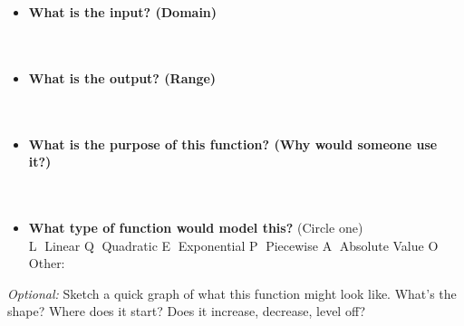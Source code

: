 \documentclass[12pt]{article}
\begin{document}
\begin{itemize}
  \item \textbf{What is the input? (Domain)} \\[0.5em]
    \underline{\hspace{0.9\textwidth}}\\[1em]
      \underline{\hspace{0.9\textwidth}}\\

  \item \textbf{What is the output? (Range)} \\[0.5em]
    \underline{\hspace{0.9\textwidth}}\\[1em]
      \underline{\hspace{0.9\textwidth}}\\

  \item \textbf{What is the purpose of this function? (Why would someone use it?)} \\[0.5em]
    \underline{\hspace{0.9\textwidth}}\\[1em]
      \underline{\hspace{0.9\textwidth}}\\

  \item \textbf{What type of function would model this?} (Circle one) \\[0.5em]
  \textcircled{\scriptsize L} Linear \quad
  \textcircled{\scriptsize Q} Quadratic \quad
  \textcircled{\scriptsize E} Exponential \quad
  \textcircled{\scriptsize P} Piecewise \quad
  \textcircled{\scriptsize A} Absolute Value \quad
  \textcircled{\scriptsize O} Other: \underline{\hspace{1in}}

\end{itemize}

\vspace{2em}

\textit{Optional:} Sketch a quick graph of what this function might look like. What’s the shape? Where does it start? Does it increase, decrease, level off?

\vspace{2em}
\end{document}
